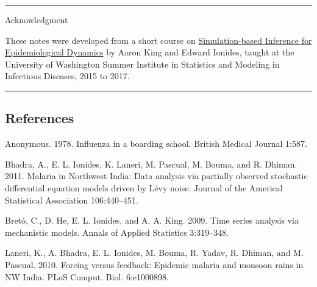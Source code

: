 \documentclass[]{article}
\begin{document}
\begin{center}\rule{0.5\linewidth}{\linethickness}\end{center}

Acknowledgment

These notes were developed from a short course on
\href{http://kingaa.github.io/sbied/}{Simulation-based Inference for
Epidemiological Dynamics} by Aaron King and Edward Ionides, taught at
the University of Washington Summer Institute in Statistics and Modeling
in Infectious Diseases, 2015 to 2017.

\begin{center}\rule{0.5\linewidth}{\linethickness}\end{center}

\subsection*{References}\label{references}

\hypertarget{refs}{}
\hypertarget{ref-anonymous78}{}
Anonymous. 1978. Influenza in a boarding school. British Medical Journal
1:587.

\hypertarget{ref-bhadra11}{}
Bhadra, A., E. L. Ionides, K. Laneri, M. Pascual, M. Bouma, and R.
Dhiman. 2011. Malaria in Northwest India: Data analysis via partially
observed stochastic differential equation models driven by Lévy noise.
Journal of the Americal Statistical Association 106:440--451.

\hypertarget{ref-breto09}{}
Bretó, C., D. He, E. L. Ionides, and A. A. King. 2009. Time series
analysis via mechanistic models. Annals of Applied Statistics
3:319--348.

\hypertarget{ref-laneri10}{}
Laneri, K., A. Bhadra, E. L. Ionides, M. Bouma, R. Yadav, R. Dhiman, and
M. Pascual. 2010. Forcing versus feedback: Epidemic malaria and monsoon
rains in NW India. PLoS Comput. Biol. 6:e1000898.
\end{document}
